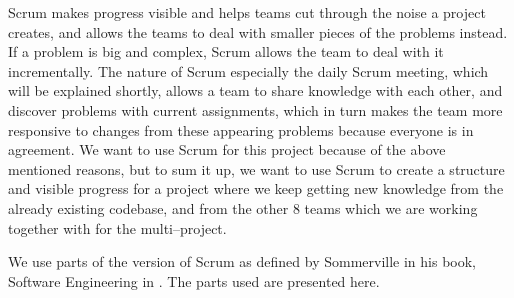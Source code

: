 Scrum makes progress visible and helps teams cut through the noise a project creates, and allows the teams to deal with smaller pieces of the problems instead.
If a problem is big and complex, Scrum allows the team to deal with it incrementally.
The nature of Scrum especially the daily Scrum meeting, which will be explained shortly, allows a team to share knowledge with each other, and discover problems with current assignments, which in turn makes the team more responsive to changes from these appearing problems because everyone is in agreement.
We want to use Scrum for this project because of the above mentioned reasons, but to sum it up, we want to use Scrum to create a structure and visible progress for a project where we keep getting new knowledge from the already existing codebase, and from the other 8 teams which we are working together with for the multi--project.

\newpage
We use parts of the version of Scrum as defined by Sommerville in his book, Software Engineering in \cite[Chapter~3]{SEBOOK}.
The parts used are presented here.

